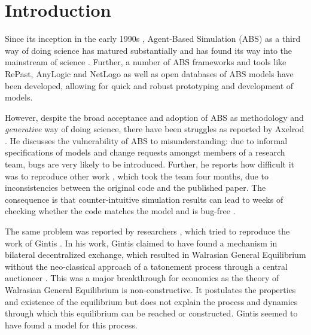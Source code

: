 \section{Introduction}
\label{sec:introduction}
Since its inception in the early 1990s \cite{epstein_growing_1996,siebers_introduction_2008,wooldridge_introduction_2009}, Agent-Based Simulation (ABS) as a third way of doing science \cite{axelrod_advancing_1997,axelrod_guide_2006} has matured substantially and has found its way into the mainstream of science \cite{macal_everything_2016}. Further, a number of ABS frameworks and tools like RePast, AnyLogic and NetLogo as well as open databases of ABS models \cite{openabm_model_database}
have been developed, allowing for quick and robust prototyping and development of models.  

However, despite the broad acceptance and adoption of ABS as methodology and \textit{generative} way of doing science, there have been struggles as reported by Axelrod \cite{axelrod_chapter_2006}. He discusses the vulnerability of ABS to misunderstanding: due to informal specifications of models and change requests amongst members of a research team, bugs are very likely to be introduced. Further, he reports how difficult it was to reproduce other work \cite{axelrod_convergence_1995}, which took the team four months, due to inconsistencies between the original code and the published paper. The consequence is that counter-intuitive simulation results can lead to weeks of checking whether the code matches the model and is bug-free \cite{axelrod_advancing_1997}.

The same problem was reported by researchers \cite{botta2013mathematical}, which tried to reproduce the work of Gintis \cite{gintis_emergence_2006}. In his work, Gintis claimed to have found a mechanism in bilateral decentralized exchange, which resulted in Walrasian General Equilibrium without the neo-classical approach of a tatonement process through a central auctioneer \cite{colell_microeconomic_1995}. This was a major breakthrough for economics as the theory of Walrasian General Equilibrium is non-constructive. It postulates the properties and existence of the equilibrium but does not explain the process and dynamics through which this equilibrium can be reached or constructed. Gintis seemed to have found a model for this process.

